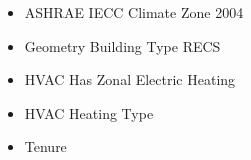 \begin{itemize}
\item ASHRAE IECC Climate Zone 2004
\item Geometry Building Type RECS
\item HVAC Has Zonal Electric Heating
\item HVAC Heating Type
\item Tenure
\end{itemize}
